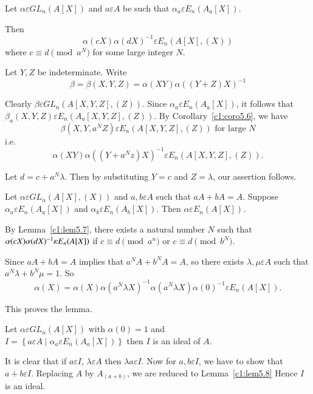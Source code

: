 \begin{lem}\label{c1:lem5.7}
Let $\alpha \varepsilon GL_n(A[X])$ and $a \varepsilon A$ be such that
$\alpha_a\varepsilon E_n(A_a[X])$. 

Then
$$
\alpha(cX)\alpha(dX)^{-1}\varepsilon E_n(A[X],(X))
$$
where $c\equiv d\pmod{a^{N}}$ for some large integer $N$.
\end{lem}


\begin{Proof}
Let $Y,Z$ be indeterminate. Write
$$
\beta=\beta(X,Y,Z)=\alpha(XY)\alpha((Y+Z)X)^{-1}
$$

Clearly $\beta \varepsilon GL_n(A[X,Y,Z], (Z))$. Since
$\alpha_a\varepsilon E_n(A_a[X])$, it follows that
$\beta_a(X,Y,Z)\varepsilon E_n(A_a[X,Y,Z],(Z))$. By
Corollary~\ref{c1:coro5.6}, we have 
$$
\beta\left(X,Y,a^{N}Z\right)\varepsilon E_n(A[X,Y,Z],(Z)) \text{ for
  large } N
$$
i.e.
$$
\alpha(XY)\alpha\left(\left(Y+a^{N}z\right)X\right)^{-1}\varepsilon E_n(A[X,Y,Z],(Z)).
$$

Let $d=c+a^{N}\lambda$. Then by substituting $Y=c$ and $Z=\lambda$,
our assertion follows.
\enprf
\end{Proof}

\begin{lem}\label{c1:lem5.8}
Let $\alpha\varepsilon GL_n(A[X],(X))$ and $a,b \varepsilon A$ such
that $aA+bA=A$. Suppose $\alpha_a\varepsilon E_n(A_a[X])$ and
$\alpha_b\varepsilon E_n(A_b[X])$. Then $\alpha \varepsilon E_n(A[X])$.
\end{lem}

\begin{Proof}
By Lemma~\ref{c1:lem5.7}, there exists a natural number $N$ such that
$\alpha\\(cX)\alpha(dX)^{-1}\varepsilon E_n(A[X])$ if $c\equiv
d\pmod{a^{n}}$ or $c\equiv d\pmod b^{N}$.

Since $aA+bA=A$ implies that $a^{N}A+b^{N}A=A$, so there exists
$\lambda, \mu \varepsilon A$ such that $a^{N}\lambda+b^{N}\mu=1$. So 
$$
\alpha(X)=\alpha(X)\alpha\left(a^{N}\lambda X\right)^{-1}\alpha\left(a^{N}\lambda
X\right)\alpha(0)^{-1}\varepsilon E_n(A[X]). 
$$

This proves the lemma.
\enprf
\end{Proof}

\begin{lem}\label{c1:lem5.9}
Let $\alpha \varepsilon GL_n(A[X])$ with $\alpha(0)=1$ and\\
$I=\left\{a\varepsilon A\mid \alpha_a\varepsilon E_n(A_a[X])\right\}$
then $I$ is an ideal of $A$.
\end{lem}

\begin{Proof}
It is clear that if $a\varepsilon I$, $\lambda \varepsilon A$ then
$\lambda a\varepsilon I$. Now for $a, b \varepsilon I$, we have to
show that $a+b\varepsilon I$. Replacing $A$ by $A_{(a+b)}$, we are
reduced to Lemma~\ref{c1:lem5.8} Hence $I$ is an ideal.
\enprf
\end{Proof}
